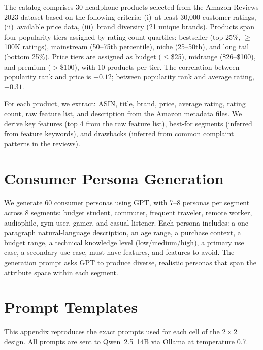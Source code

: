 \documentclass[11pt]{article}
\begin{document}
The catalog comprises 30 headphone products selected from the Amazon Reviews 2023 dataset based on the following criteria: (i)~at least 30{,}000 customer ratings, (ii)~available price data, (iii)~brand diversity (21 unique brands). Products span four popularity tiers assigned by rating-count quartiles: bestseller (top 25\%, $\geq$100K ratings), mainstream (50--75th percentile), niche (25--50th), and long tail (bottom 25\%). Price tiers are assigned as budget ($\leq$\$25), midrange (\$26--\$100), and premium ($>$\$100), with 10 products per tier. The correlation between popularity rank and price is $+0.12$; between popularity rank and average rating, $+0.31$.

For each product, we extract: ASIN, title, brand, price, average rating, rating count, raw feature list, and description from the Amazon metadata files. We derive key features (top 4 from the raw feature list), best-for segments (inferred from feature keywords), and drawbacks (inferred from common complaint patterns in the reviews).

\section{Consumer Persona Generation}\label{section:personas}

We generate 60 consumer personas using GPT, with 7--8 personas per segment across 8 segments: budget student, commuter, frequent traveler, remote worker, audiophile, gym user, gamer, and casual listener. Each persona includes: a one-paragraph natural-language description, an age range, a purchase context, a budget range, a technical knowledge level (low/medium/high), a primary use case, a secondary use case, must-have features, and features to avoid. The generation prompt asks GPT to produce diverse, realistic personas that span the attribute space within each segment.

\section{Prompt Templates}\label{section:prompts}

This appendix reproduces the exact prompts used for each cell of the $2 \times 2$ design. All prompts are sent to Qwen~2.5~14B via Ollama at temperature 0.7.
\end{document}
